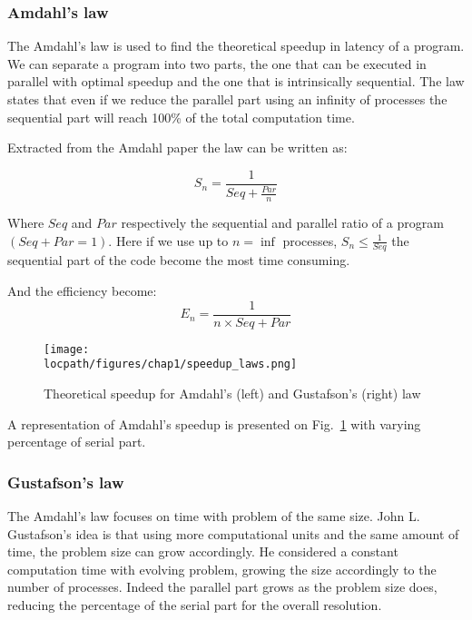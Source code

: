 \subsubsection{Amdahl's law}
The Amdahl's law\cite{amdahl1967validity} is used to find the theoretical speedup in latency of a program.
We can separate a program into two parts, the one that can be executed in parallel with optimal speedup and the one that is intrinsically sequential.
The law states that even if we reduce the parallel part using an infinity of processes the sequential part will reach 100\% of the total computation time. 

Extracted from the Amdahl paper the law can be written as: 

\begin{equation}
S_n = \frac{1}{Seq + \frac{Par}{n}}
\end{equation}

Where $Seq$ and $Par$ respectively the sequential and parallel ratio of a program $( Seq + Par = 1 )$.
Here if we use up to $n=\inf$ processes, $S_n \leq \frac{1}{Seq}$ the sequential part of the code become the most time consuming. 

And the efficiency become:
\begin{equation}
E_n = \frac{1}{n\times Seq + Par}
\end{equation}

\begin{figure}
\texttt{[image: \\locpath/figures/chap1/speedup\_laws.png]}
\caption{Theoretical speedup for Amdahl's (left) and Gustafson's (right) law}
\label{fig:1_HPC:speedup_laws}
\end{figure}

A representation of Amdahl's speedup is presented on Fig.~\ref{fig:1_HPC:speedup_laws} with varying percentage of serial part. 

\subsubsection{Gustafson's law}
The Amdahl's law focuses on time with problem of the same size. 
John L. Gustafson's idea is that using more computational units and the same amount of time, the problem size can grow accordingly. 
He considered a constant computation time with evolving problem, growing the size accordingly to the number of processes. 
Indeed the parallel part grows as the problem size does, reducing the percentage of the serial part for the overall resolution.

